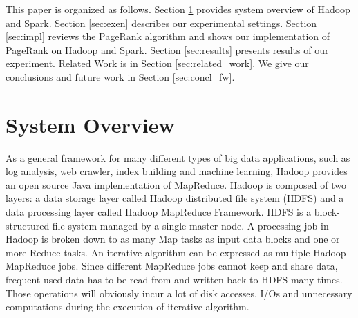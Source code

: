 \documentclass[10pt,conference,compsocconf]{IEEEtran}
\begin{document}

This paper is organized as follows. Section \ref{sec:sys_ov} provides system overview of Hadoop and Spark. Section \ref{sec:exen} describes our experimental settings. Section \ref{sec:impl} reviews the PageRank algorithm and shows our implementation of PageRank on Hadoop and Spark. Section \ref{sec:results} presents results of our experiment. Related Work is in Section \ref{sec:related_work}. We give our conclusions and future work in Section \ref{sec:concl_fw}.



\section{System Overview}
\label{sec:sys_ov}

As a general framework for many different types of big data applications, such as log analysis, web crawler, index building and machine learning, Hadoop\cite{url_hadoop} provides an open source Java implementation of MapReduce. Hadoop is composed of two layers: a data storage layer called Hadoop distributed file system (HDFS) and a data processing layer called Hadoop MapReduce Framework. HDFS is a block-structured file system managed by a single master node.  A processing job in Hadoop is broken down to as many Map tasks as input data blocks and one or more Reduce tasks. An iterative algorithm can be expressed as multiple Hadoop MapReduce jobs. Since different MapReduce jobs cannot keep and share data, frequent used data has to be read from and written back to HDFS many times. Those operations will obviously incur a lot of disk accesses, I/Os and unnecessary computations \cite{jaliya2010} \cite{yingyi2010} \cite{yanfeng2011} during the execution of iterative algorithm.
\end{document}
